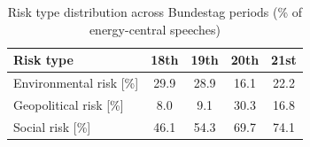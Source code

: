 \begin{table}[H]
    \centering
    \begin{tabular}{lcccc}
        \toprule
        Risk type & 18th & 19th & 20th & 21st \\
        \midrule
        Environmental risk [\%] & 29.9 & 28.9 & 16.1 & 22.2 \\
        Geopolitical risk [\%] & 8.0 & 9.1 & 30.3 & 16.8 \\
        Social risk [\%] & 46.1 & 54.3 & 69.7 & 74.1 \\
        \bottomrule
    \end{tabular}
    \caption{Risk type distribution across Bundestag periods
    (\% of energy-central speeches)}
    \label{tab:risk_period}
\end{table}
